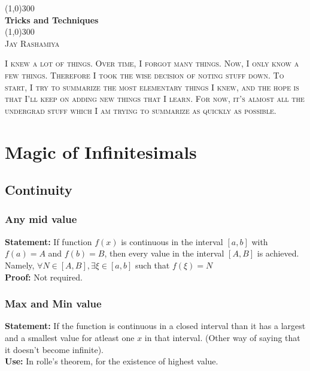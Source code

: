 \documentclass{report}
\author{Jay Rashamiya}
\begin{document}
\begin{titlepage}
  \begin{center}
    \line(1,0){300}\\
    \huge{\bfseries Tricks and Techniques}\\
    \line(1,0){300}\\
    \textsc{\LARGE Jay Rashamiya}\\
    \vspace{5cm}
  \end{center}

  \noindent \textsc{\large I knew a lot of things. Over time, I forgot many things. Now, I only know a few things. Therefore I took the wise decision of noting stuff down. To start, I try to summarize the most elementary things I knew, and the hope is that I'll keep on adding new things that I learn. For now, it's almost all the undergrad stuff which I am trying to summarize as quickly as possible.}
\end{titlepage}

\tableofcontents

\chapter{Magic of Infinitesimals}
\section{Continuity}
\subsection{Any mid value}
\textbf{Statement:} If function $f(x)$ is continuous in the interval $[a,b]$ with $f(a) = A$ and $f(b) = B$, then every value in the interval $[A,B]$ is achieved. Namely, $\forall N \in [A,B], \exists \xi \in [a,b]$ such that $f(\xi) = N$ \\

\noindent\textbf{Proof:} Not required.

\subsection{Max and Min value}
\textbf{Statement:} If the function is continuous in a closed interval than it has a largest and a smallest value for atleast one $x$ in that interval. (Other way of saying that it doesn't become infinite). \\

\noindent\textbf{Use:} In rolle's theorem, for the existence of highest value.
\end{document}
